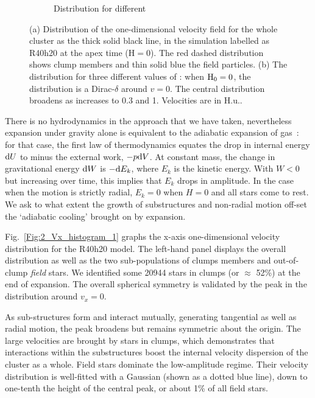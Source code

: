 \begin{figure}
\begin{subfigure}[b]{0.49\textwidth}
        \caption{Distribution for different \tHub}
        \label{Fig:2_Vx_histogram_2}
    \end{subfigure}
\caption[One-dimensional velocity distribution of clump members and field stars]{(a) Distribution of the one-dimensional velocity field for the whole cluster as the thick solid black line, in the simulation labelled as R40h20 at the apex time (H$ = 0$). The red dashed distribution shows clump members and thin solid blue the field particles. (b) The distribution for three different values of \tHub: when ${\textrm{H}}_0 = 0$, the distribution is a Dirac-$\delta$ around $v = 0$. The central distribution broadens as \tHub increases to 0.3 and 1. Velocities are in H.u..} 
\label{Fig:2_Vx_histogram}
\end{figure}




 There is no hydrodynamics in the approach that we have taken, nevertheless expansion under gravity alone is equivalent to the adiabatic expansion of gas~: for that case, the first law of thermodynamics equates the drop in internal energy ${\rm d}U$ to minus the external work,  $-p {\rm d}V$. At constant mass, the change in gravitational energy ${\rm d}W$ is $ - {\rm d}E_k$, where $E_k$ is the kinetic energy. With $W < 0 $ but increasing over time, this implies that $E_k$ drops in amplitude. In the case when the motion is strictly radial, $E_k = 0$ when $H = 0$ and all stars come to rest. We ask to what extent the growth of substructures and non-radial motion  off-set the `adiabatic cooling' brought on by expansion. 

Fig.~\ref{Fig:2_Vx_histogram_1} graphs the x-axis one-dimensional velocity distribution for the R40h20 model. The left-hand panel displays the overall distribution as well as the two sub-populations of clumps members and out-of-clump \textit{field} stars. We identified some 20944 stars in clumps (or $\approx $ 52\%) at the end of expansion. The overall spherical symmetry is validated by the peak in the distribution around $v_x = 0$.

As sub-structures form and  interact mutually, generating tangential as well as radial motion, the peak broadens but remains symmetric about the origin.  The large velocities are brought by stars in clumps, which demonstrates that interactions within the substructures boost the internal velocity dispersion of the cluster as a whole. Field stars dominate the low-amplitude regime. Their velocity distribution is well-fitted with a  Gaussian (shown as a dotted blue line), down to one-tenth the height of the central peak, or about 1\% of all field stars. 

